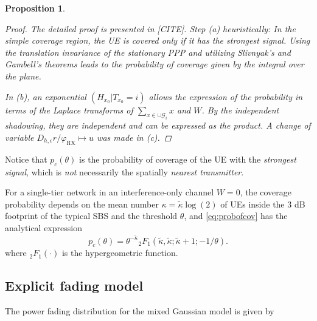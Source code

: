 \documentclass[conference]{IEEEtran}
\theoremstyle{definition}
\theoremstyle{plain}
\newtheorem{prop}[thm4]{Proposition}
\begin{document}
\begin{prop}
            \begin{proof}
              The detailed proof is presented in [CITE]. Step (a) heuristically: In the simple coverage region, the UE is covered \textit{only if} it has the strongest signal. Using the translation invariance of the stationary PPP and utilizing Slivnyak's and Gambell's theorems leads to the probability of coverage given by the integral over the plane.

              In (b), an exponential $(H_{x_0}|T_{x_0}=i)$ allows the expression of the probability in terms of the Laplace transforms of $\sum_{x \in \cup \mathcal{G}_i}x$ and $W$. By the independent shadowing, they are independent and can be expressed as the product. A change of variable $D_{h,\epsilon}r/\varphi_{\text{RX}} \mapsto u$ was made in (c). 
              
            \end{proof}
          \end{prop}
          Notice that $p_c(\theta)$ is the probability of coverage of the UE with the \textit{strongest signal}, which is \textit{not} necessarily the spatially  \textit{nearest transmitter}.

          For a single-tier network in an interference-only channel $W=0$, the coverage probability depends on the mean number $\kappa = \tilde{\kappa} \log(2)$ of UEs inside the  $3$ dB footprint of the typical SBS and the threshold $\theta$, and \eqref{eq:probofcov} has the analytical expression
          \begin{equation}
p_c(\theta) =  \theta^{-\tilde{\kappa}} {_2F_1}\left(\tilde{\kappa}, \tilde{\kappa};\tilde{\kappa} + 1; -1/\theta \right).
          \end{equation}
          where $_2F_1(\cdot)$ is the hypergeometric function. 
          \subsection{Explicit fading model}
          The power fading distribution for the mixed Gaussian model is given by
\end{document}
